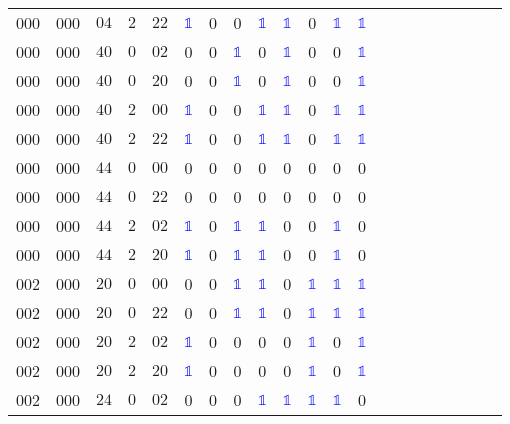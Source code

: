 \begin{longtable*}{c| cccccccccccccccccccc }
000& 000& $04$& $2$& $22$& \textcolor{blue}{$\mathds{1}$}& 0& 0& \textcolor{blue}{$\mathds{1}$}& \textcolor{blue}{$\mathds{1}$}& 0& \textcolor{blue}{$\mathds{1}$}& \textcolor{blue}{$\mathds{1}$}\\
000& 000& $40$& $0$& $02$& 0& 0& \textcolor{blue}{$\mathds{1}$}& 0& \textcolor{blue}{$\mathds{1}$}& 0& 0& \textcolor{blue}{$\mathds{1}$}\\
000& 000& $40$& $0$& $20$& 0& 0& \textcolor{blue}{$\mathds{1}$}& 0& \textcolor{blue}{$\mathds{1}$}& 0& 0& \textcolor{blue}{$\mathds{1}$}\\
000& 000& $40$& $2$& $00$& \textcolor{blue}{$\mathds{1}$}& 0& 0& \textcolor{blue}{$\mathds{1}$}& \textcolor{blue}{$\mathds{1}$}& 0& \textcolor{blue}{$\mathds{1}$}& \textcolor{blue}{$\mathds{1}$}\\
000& 000& $40$& $2$& $22$& \textcolor{blue}{$\mathds{1}$}& 0& 0& \textcolor{blue}{$\mathds{1}$}& \textcolor{blue}{$\mathds{1}$}& 0& \textcolor{blue}{$\mathds{1}$}& \textcolor{blue}{$\mathds{1}$}\\
000& 000& $44$& $0$& $00$& 0& 0& 0& 0& 0& 0& 0& 0\\
000& 000& $44$& $0$& $22$& 0& 0& 0& 0& 0& 0& 0& 0\\
000& 000& $44$& $2$& $02$& \textcolor{blue}{$\mathds{1}$}& 0& \textcolor{blue}{$\mathds{1}$}& \textcolor{blue}{$\mathds{1}$}& 0& 0& \textcolor{blue}{$\mathds{1}$}& 0\\
000& 000& $44$& $2$& $20$& \textcolor{blue}{$\mathds{1}$}& 0& \textcolor{blue}{$\mathds{1}$}& \textcolor{blue}{$\mathds{1}$}& 0& 0& \textcolor{blue}{$\mathds{1}$}& 0\\
002& 000& $20$& $0$& $00$& 0& 0& \textcolor{blue}{$\mathds{1}$}& \textcolor{blue}{$\mathds{1}$}& 0& \textcolor{blue}{$\mathds{1}$}& \textcolor{blue}{$\mathds{1}$}& \textcolor{blue}{$\mathds{1}$}\\
002& 000& $20$& $0$& $22$& 0& 0& \textcolor{blue}{$\mathds{1}$}& \textcolor{blue}{$\mathds{1}$}& 0& \textcolor{blue}{$\mathds{1}$}& \textcolor{blue}{$\mathds{1}$}& \textcolor{blue}{$\mathds{1}$}\\
002& 000& $20$& $2$& $02$& \textcolor{blue}{$\mathds{1}$}& 0& 0& 0& 0& \textcolor{blue}{$\mathds{1}$}& 0& \textcolor{blue}{$\mathds{1}$}\\
002& 000& $20$& $2$& $20$& \textcolor{blue}{$\mathds{1}$}& 0& 0& 0& 0& \textcolor{blue}{$\mathds{1}$}& 0& \textcolor{blue}{$\mathds{1}$}\\
002& 000& $24$& $0$& $02$& 0& 0& 0& \textcolor{blue}{$\mathds{1}$}& \textcolor{blue}{$\mathds{1}$}& \textcolor{blue}{$\mathds{1}$}& \textcolor{blue}{$\mathds{1}$}& 0\\

\end{longtable*}
